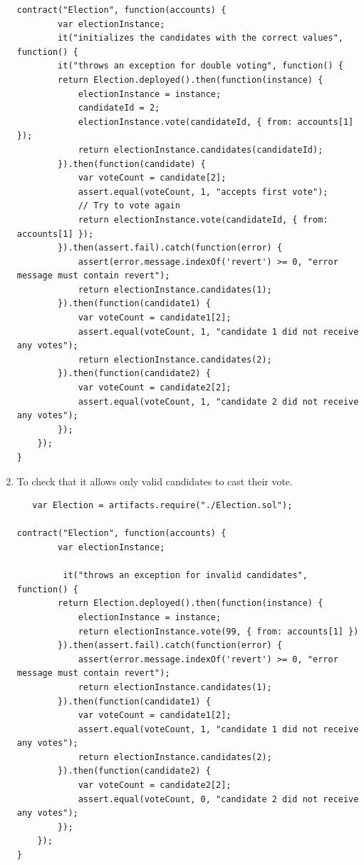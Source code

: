 \documentclass{article}
\begin{document}
\begin{enumerate}
\begin{verbatim}
contract("Election", function(accounts) {
        var electionInstance;
        it("initializes the candidates with the correct values", function() {
        it("throws an exception for double voting", function() {
        return Election.deployed().then(function(instance) {
            electionInstance = instance;
            candidateId = 2;
            electionInstance.vote(candidateId, { from: accounts[1] });
            return electionInstance.candidates(candidateId);
        }).then(function(candidate) {
            var voteCount = candidate[2];
            assert.equal(voteCount, 1, "accepts first vote");
            // Try to vote again
            return electionInstance.vote(candidateId, { from: accounts[1] });
        }).then(assert.fail).catch(function(error) {
            assert(error.message.indexOf('revert') >= 0, "error message must contain revert");
            return electionInstance.candidates(1);
        }).then(function(candidate1) {
            var voteCount = candidate1[2];
            assert.equal(voteCount, 1, "candidate 1 did not receive any votes");
            return electionInstance.candidates(2);
        }).then(function(candidate2) {
            var voteCount = candidate2[2];
            assert.equal(voteCount, 1, "candidate 2 did not receive any votes");
        });
    });
}

   \end{verbatim}
   
   \item To check that it allows only valid candidates to cast their vote.
   \begin{verbatim}
   var Election = artifacts.require("./Election.sol");

contract("Election", function(accounts) {
        var electionInstance;
   
         it("throws an exception for invalid candidates", function() {
        return Election.deployed().then(function(instance) {
            electionInstance = instance;
            return electionInstance.vote(99, { from: accounts[1] })
        }).then(assert.fail).catch(function(error) {
            assert(error.message.indexOf('revert') >= 0, "error message must contain revert");
            return electionInstance.candidates(1);
        }).then(function(candidate1) {
            var voteCount = candidate1[2];
            assert.equal(voteCount, 1, "candidate 1 did not receive any votes");
            return electionInstance.candidates(2);
        }).then(function(candidate2) {
            var voteCount = candidate2[2];
            assert.equal(voteCount, 0, "candidate 2 did not receive any votes");
        });
    });
} 
 \end{verbatim}

\end{enumerate}
\end{document}
